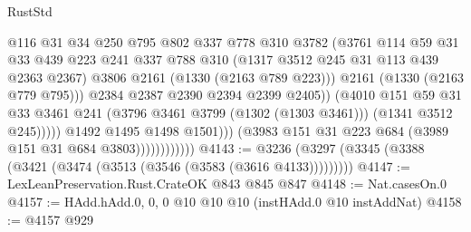\begin{lexlean}{RustStd}
\begin{coremodule}
                                          @116
                                          @31
                                          @34
                                          @250
                                          @795
                                          @802
                                          @337
                                          @778
                                          @310
                                          @3782
                                          (@3761
                                            @114
                                            @59
                                            @31
                                            @33
                                            @439
                                            @223
                                            @241
                                            @337
                                            @788
                                            @310
                                            (@1317 @3512 @245 @31 @113 @439 @2363 @2367)
                                            @3806
                                            @2161
                                            (@1330 (@2163 @789 @223)))
                                          @2161
                                          (@1330 (@2163 @779 @795)))
                                        @2384
                                        @2387
                                        @2390
                                        @2394
                                        @2399
                                        @2405))
                                    (@4010
                                      @151
                                      @59
                                      @31
                                      @33
                                      @3461
                                      @241
                                      (@3796 @3461 @3799 (@1302 (@1303 @3461)))
                                      (@1341 @3512 @245)))))
                              @1492
                              @1495
                              @1498
                              @1501)))
                        (@3983 @151 @31 @223 @684 (@3989 @151 @31 @684 @3803))))))))))))
@4143 := @3236 (@3297 (@3345 (@3388 (@3421 (@3474 (@3513 (@3546 (@3583 (@3616 @4133)))))))))
@4147 := LexLeanPreservation.Rust.CrateOK @843 @845 @847
@4148 := Nat.casesOn.{0}
@4157 := HAdd.hAdd.{0, 0, 0} @10 @10 @10 (instHAdd.{0} @10 instAddNat)
@4158 := @4157 @929

\end{coremodule}
\end{lexlean}
